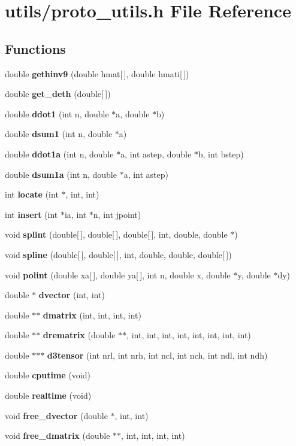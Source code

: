 \section{utils/proto\_\-utils.h File Reference}
\label{proto__utils_8h}
\subsection*{Functions}
\begin{CompactItemize}
\item 
double {\bf gethinv9} (double hmat[$\,$], double hmati[$\,$])
\item 
double {\bf get\_\-deth} (double[$\,$])
\item 
double {\bf ddot1} (int n, double $\ast$a, double $\ast$b)
\item 
double {\bf dsum1} (int n, double $\ast$a)
\item 
double {\bf ddot1a} (int n, double $\ast$a, int astep, double $\ast$b, int bstep)
\item 
double {\bf dsum1a} (int n, double $\ast$a, int astep)
\item 
int {\bf locate} (int $\ast$, int, int)
\item 
int {\bf insert} (int $\ast$ia, int $\ast$n, int jpoint)
\item 
void {\bf splint} (double[$\,$], double[$\,$], double[$\,$], int, double, double $\ast$)
\item 
void {\bf spline} (double[$\,$], double[$\,$], int, double, double, double[$\,$])
\item 
void {\bf polint} (double xa[$\,$], double ya[$\,$], int n, double x, double $\ast$y, double $\ast$dy)
\item 
double $\ast$ {\bf dvector} (int, int)
\item 
double $\ast$$\ast$ {\bf dmatrix} (int, int, int, int)
\item 
double $\ast$$\ast$ {\bf drematrix} (double $\ast$$\ast$, int, int, int, int, int, int, int, int)
\item 
double $\ast$$\ast$$\ast$ {\bf d3tensor} (int nrl, int nrh, int ncl, int nch, int ndl, int ndh)
\item 
double {\bf cputime} (void)
\item 
double {\bf realtime} (void)
\item 
void {\bf free\_\-dvector} (double $\ast$, int, int)
\item 
void {\bf free\_\-dmatrix} (double $\ast$$\ast$, int, int, int, int)

\end{CompactItemize}
